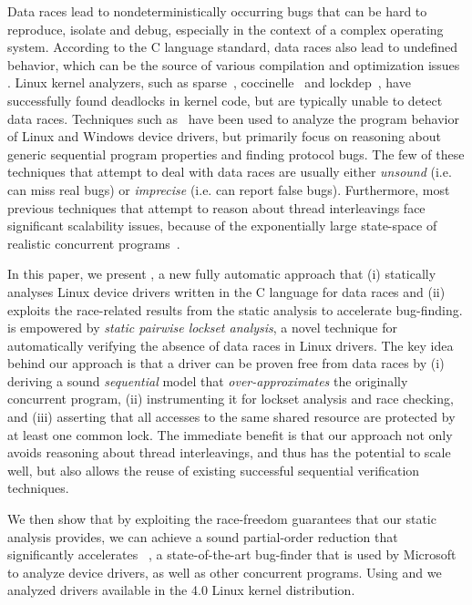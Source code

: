 Data races lead to nondeterministically occurring bugs that can be hard to reproduce, isolate and debug, especially in the context of a complex operating system. According to the C language standard, data races also lead to undefined behavior, which can be the source of various compilation and optimization issues . Linux kernel analyzers, such as sparse~\cite{corbet2004sparse}, coccinelle~\cite{padioleau2008doc} and lockdep~\cite{corbet2006lock}, have successfully found deadlocks in kernel code, but are typically unable to detect data races. Techniques such as~\cite{ball2006thorough, clarke2004predicate, qadeer2004kiss, engler2000checking, henzinger2002temporal, cook2006termination, pratikakis2006locksmith, kuznetsov2010testing, renzelmann2012symdrive, lal2012corral} have been used to analyze the program behavior of Linux and Windows device drivers, but primarily focus on reasoning about generic sequential program properties and finding protocol bugs. The few of these techniques that attempt to deal with data races are usually either \emph{unsound} (i.e. can miss real bugs) or \emph{imprecise} (i.e. can report false bugs). Furthermore, most previous techniques that attempt to reason about thread interleavings face significant scalability issues, because of the exponentially large state-space of realistic concurrent programs~\cite{musuvathi2008finding}.

In this paper, we present \whoop, a new fully automatic approach that (i) statically analyses Linux device drivers written in the C language for data races and (ii) exploits the race-related results from the static analysis to accelerate bug-finding. \whoop is empowered by \emph{static pairwise lockset analysis}, a novel technique for automatically verifying the absence of data races in Linux drivers. The key idea behind our approach is that a driver can be proven free from data races by (i) deriving a sound \emph{sequential} model that \emph{over-approximates} the originally concurrent program, (ii) instrumenting it for lockset analysis and race checking, and (iii) asserting that all accesses to the same shared resource are protected by at least one common lock. The immediate benefit is that our approach not only avoids reasoning about thread interleavings, and thus has the potential to scale well, but also allows the reuse of existing successful sequential verification techniques.

We then show that by exploiting the race-freedom guarantees that our static analysis provides, we can achieve a sound partial-order reduction that significantly accelerates \corral~\cite{lal2012solver}, a state-of-the-art bug-finder that is used by Microsoft to analyze device drivers, as well as other concurrent programs. Using \whoop and \corral we analyzed \sizeOfBenchmarks drivers available in the 4.0 Linux kernel distribution.

